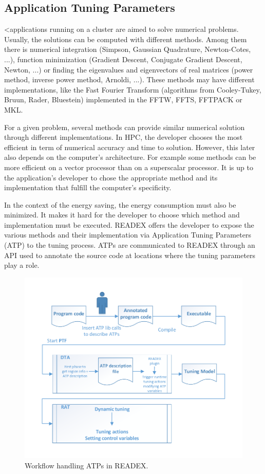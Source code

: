 \subsection{Application Tuning Parameters} \label{sec:atp}

<applications running on a cluster are aimed to solve numerical problems. Usually, the solutions can be computed with different methods. Among them there is numerical integration (Simpson, Gaussian Quadrature, Newton-Cotes, ...), function minimization (Gradient Descent, Conjugate Gradient Descent, Newton, ...) or finding the eigenvalues and eigenvectors of real matrices (power method, inverse power method, Arnoldi, ...). These methods may have different implementations, like the Fast Fourier Transform (algorithms from Cooley-Tukey, Bruun, Rader, Bluestein) implemented in the FFTW, FFTS, FFTPACK or MKL.

For a given problem, several methods can provide similar numerical solution through different implementations. In HPC, the developer chooses the most efficient in term of numerical accuracy and time to solution. However, this later also depends on the computer's architecture. For example some methods can be more efficient on a vector processor than on a superscalar processor. It is up to the application's developer to chose the appropriate method and its implementation that fulfill the computer's specificity.


In the context of the energy saving, the energy consumption must also be minimized. It makes it hard for the developer to choose which method and implementation must be executed. READEX offers the developer to expose the various methods and their implementation via Application Tuning Parameters (ATP) to the tuning process. ATPs are communicated to READEX through an API used to annotate the source code at locations where the tuning parameters play a role.

\begin{figure}
\centering
\includegraphics[width=0.8\columnwidth]{figures/overall_design.pdf} 
\caption{Workflow handling ATPs in READEX. }
\label{fig_ATP_workflow}
\end{figure} 

